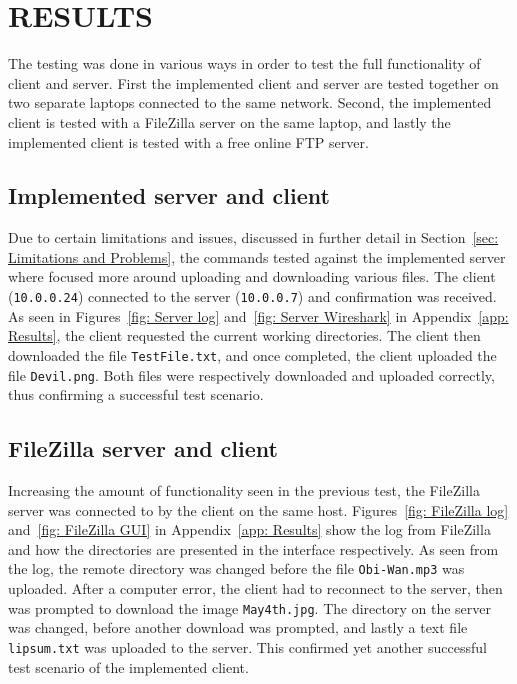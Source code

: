 \documentclass[10pt, conference]{IEEEtran}
\def\code#1{\texttt{#1}}
\begin{document}
%
\section{RESULTS}
\label{sec: Results}
The testing was done in various ways in order to test the full functionality of client and server. First the implemented client and server are tested together on two separate laptops connected to the same network. Second, the implemented client is tested with a FileZilla server on the same laptop, and lastly the implemented client is tested with a free online FTP server.

\subsection{Implemented server and client}
\label{sec: Results implemented server}
Due to certain limitations and issues, discussed in further detail in Section~\ref{sec: Limitations and Problems}, the commands tested against the implemented server where focused more around uploading and downloading various files. The client (\code{10.0.0.24}) connected to the server (\code{10.0.0.7}) and confirmation was received. As seen in Figures~\ref{fig: Server log} and~\ref{fig: Server Wireshark} in Appendix~\ref{app: Results}, the client requested the current working directories. The client then downloaded the file \code{TestFile.txt}, and once completed, the client uploaded the file \code{Devil.png}. Both files were respectively downloaded and uploaded correctly, thus confirming a successful test scenario.

\subsection{FileZilla server and client}
\label{sec: Results FileZilla}
Increasing the amount of functionality seen in the previous test, the FileZilla server was connected to by the client on the same host. Figures~\ref{fig: FileZilla log} and~\ref{fig: FileZilla GUI} in Appendix~\ref{app: Results} show the log from FileZilla and how the directories are presented in the interface respectively. As seen from the log, the remote directory was changed before the file \code{Obi-Wan.mp3} was uploaded. After a computer error, the client had to reconnect to the server, then was prompted to download the image \code{May4th.jpg}. The directory on the server was changed, before another download was prompted, and lastly a text file \code{lipsum.txt} was uploaded to the server. This confirmed yet another successful test scenario of the implemented client.
\end{document}
